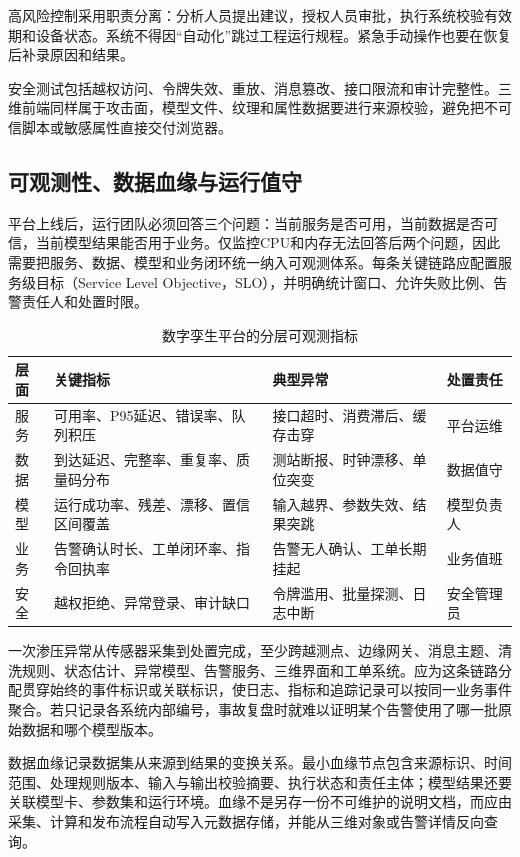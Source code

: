 高风险控制采用职责分离：分析人员提出建议，授权人员审批，执行系统校验有效期和设备状态。系统不得因“自动化”跳过工程运行规程。紧急手动操作也要在恢复后补录原因和结果。

安全测试包括越权访问、令牌失效、重放、消息篡改、接口限流和审计完整性。三维前端同样属于攻击面，模型文件、纹理和属性数据要进行来源校验，避免把不可信脚本或敏感属性直接交付浏览器。

\subsection{可观测性、数据血缘与运行值守}

平台上线后，运行团队必须回答三个问题：当前服务是否可用，当前数据是否可信，当前模型结果能否用于业务。仅监控CPU和内存无法回答后两个问题，因此需要把服务、数据、模型和业务闭环统一纳入可观测体系。每条关键链路应配置服务级目标（Service Level Objective，SLO），并明确统计窗口、允许失败比例、告警责任人和处置时限。

\begin{table}[htbp]
\centering
\caption{数字孪生平台的分层可观测指标}
\label{tab:dt-observability}
\begin{tabular}{p{2.1cm}p{4.2cm}p{4.2cm}p{2.5cm}}
\toprule
层面 & 关键指标 & 典型异常 & 处置责任 \\
\midrule
服务 & 可用率、P95延迟、错误率、队列积压 & 接口超时、消费滞后、缓存击穿 & 平台运维 \\
数据 & 到达延迟、完整率、重复率、质量码分布 & 测站断报、时钟漂移、单位突变 & 数据值守 \\
模型 & 运行成功率、残差、漂移、置信区间覆盖 & 输入越界、参数失效、结果突跳 & 模型负责人 \\
业务 & 告警确认时长、工单闭环率、指令回执率 & 告警无人确认、工单长期挂起 & 业务值班 \\
安全 & 越权拒绝、异常登录、审计缺口 & 令牌滥用、批量探测、日志中断 & 安全管理员 \\
\bottomrule
\end{tabular}
\end{table}

一次渗压异常从传感器采集到处置完成，至少跨越测点、边缘网关、消息主题、清洗规则、状态估计、异常模型、告警服务、三维界面和工单系统。应为这条链路分配贯穿始终的事件标识或关联标识，使日志、指标和追踪记录可以按同一业务事件聚合。若只记录各系统内部编号，事故复盘时就难以证明某个告警使用了哪一批原始数据和哪个模型版本。

数据血缘记录数据集从来源到结果的变换关系。最小血缘节点包含来源标识、时间范围、处理规则版本、输入与输出校验摘要、执行状态和责任主体；模型结果还要关联模型卡、参数集和运行环境。血缘不是另存一份不可维护的说明文档，而应由采集、计算和发布流程自动写入元数据存储，并能从三维对象或告警详情反向查询。

